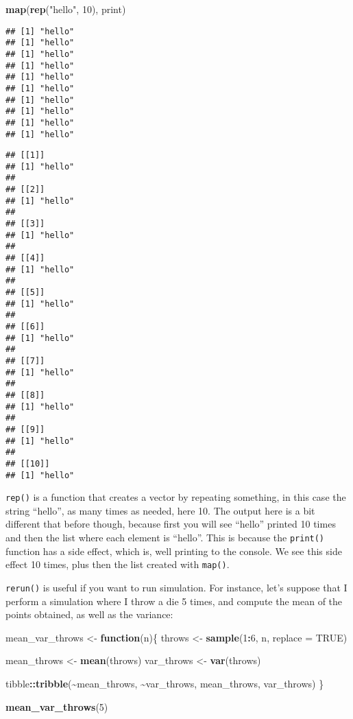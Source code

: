 \documentclass[
]{article}
\newenvironment{Shaded}{\begin{snugshade}}{\end{snugshade}}
\newcommand{\ControlFlowTok}[1]{\textcolor[rgb]{0.13,0.29,0.53}{\textbf{#1}}}
\newcommand{\DataTypeTok}[1]{\textcolor[rgb]{0.13,0.29,0.53}{#1}}
\newcommand{\DecValTok}[1]{\textcolor[rgb]{0.00,0.00,0.81}{#1}}
\newcommand{\KeywordTok}[1]{\textcolor[rgb]{0.13,0.29,0.53}{\textbf{#1}}}
\newcommand{\NormalTok}[1]{#1}
\newcommand{\OperatorTok}[1]{\textcolor[rgb]{0.81,0.36,0.00}{\textbf{#1}}}
\newcommand{\OtherTok}[1]{\textcolor[rgb]{0.56,0.35,0.01}{#1}}
\newcommand{\StringTok}[1]{\textcolor[rgb]{0.31,0.60,0.02}{#1}}
\begin{document}
\begin{Shaded}
\begin{Highlighting}[]
\KeywordTok{map}\NormalTok{(}\KeywordTok{rep}\NormalTok{(}\StringTok{"hello"}\NormalTok{, }\DecValTok{10}\NormalTok{), print)}
\end{Highlighting}
\end{Shaded}

\begin{verbatim}
## [1] "hello"
## [1] "hello"
## [1] "hello"
## [1] "hello"
## [1] "hello"
## [1] "hello"
## [1] "hello"
## [1] "hello"
## [1] "hello"
## [1] "hello"
\end{verbatim}

\begin{verbatim}
## [[1]]
## [1] "hello"
## 
## [[2]]
## [1] "hello"
## 
## [[3]]
## [1] "hello"
## 
## [[4]]
## [1] "hello"
## 
## [[5]]
## [1] "hello"
## 
## [[6]]
## [1] "hello"
## 
## [[7]]
## [1] "hello"
## 
## [[8]]
## [1] "hello"
## 
## [[9]]
## [1] "hello"
## 
## [[10]]
## [1] "hello"
\end{verbatim}

\texttt{rep()} is a function that creates a vector by repeating something, in this case the string ``hello'',
as many times as needed, here 10. The output here is a bit different that before though, because first
you will see ``hello'' printed 10 times and then the list where each element is ``hello''.
This is because the \texttt{print()} function has a side effect, which is, well printing to the console.
We see this side effect 10 times, plus then the list created with \texttt{map()}.

\texttt{rerun()} is useful if you want to run simulation. For instance, let's suppose that I perform a simulation
where I throw a die 5 times, and compute the mean of the points obtained, as well as the variance:

\begin{Shaded}
\begin{Highlighting}[]
\NormalTok{mean\_var\_throws \textless{}{-}}\StringTok{ }\ControlFlowTok{function}\NormalTok{(n)\{}
\NormalTok{  throws \textless{}{-}}\StringTok{ }\KeywordTok{sample}\NormalTok{(}\DecValTok{1}\OperatorTok{:}\DecValTok{6}\NormalTok{, n, }\DataTypeTok{replace =} \OtherTok{TRUE}\NormalTok{)}

\NormalTok{  mean\_throws \textless{}{-}}\StringTok{ }\KeywordTok{mean}\NormalTok{(throws)}
\NormalTok{  var\_throws \textless{}{-}}\StringTok{ }\KeywordTok{var}\NormalTok{(throws)}

\NormalTok{  tibble}\OperatorTok{::}\KeywordTok{tribble}\NormalTok{(}\OperatorTok{\textasciitilde{}}\NormalTok{mean\_throws, }\OperatorTok{\textasciitilde{}}\NormalTok{var\_throws,}
\NormalTok{                   mean\_throws, var\_throws)}
\NormalTok{\}}

\KeywordTok{mean\_var\_throws}\NormalTok{(}\DecValTok{5}\NormalTok{)}
\end{Highlighting}
\end{Shaded}
\end{document}
